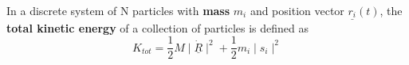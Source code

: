 \begin{definition}
	In a discrete system of N particles with {\bf mass} $m_i$ and position vector $\underline{r_i}\left(t  \right) $, the {\bf total kinetic energy} of a collection of particles is defined as
	\begin{equation}
		\label{eq:total-kinetic-energy-2}
		K_{tot} = \frac{1}{2}M\mid\underline{\dot{R}} \mid^{2} + \frac{1}{2}m_{i}\mid s_{i}\mid^{2}
	\end{equation}

\end{definition}

\clearpage
